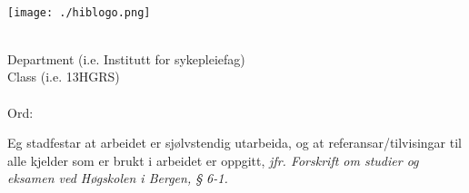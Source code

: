 %
\begin{titlepage}
\begin{center}

{%
    \hfill \forfattar\\[1cm]
}

\texttt{[image: ./hiblogo.png]}~\\[4cm]

{%
    \huge \bfseries \tittel \\[4cm]
}

{%
    \large Department (i.e. Institutt for sykepleiefag)\\
    \large Class (i.e. 13HGRS)\\
    \large \dato\\
    \large Ord: 
}

{%
    \begin{center}
        Eg stadfestar at arbeidet er sjølvstendig utarbeida, og at referansar/tilvisingar til alle kjelder som er brukt i arbeidet er oppgitt,
         \textit{jfr. Forskrift om studier og eksamen ved Høgskolen i Bergen, § 6-1.}
     \end{center}
 }

\vfill

\end{center}
\end{titlepage}

